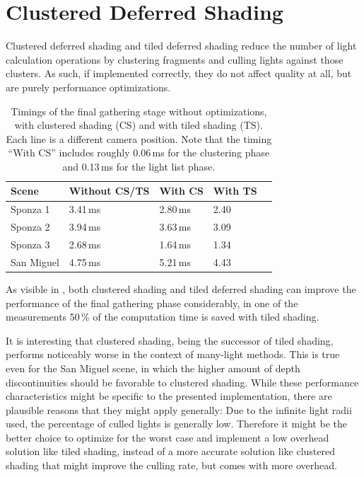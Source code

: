 



\section{Clustered Deferred Shading}
\label{sec:results:clusteredShading}

Clustered deferred shading and tiled deferred shading reduce the number of light calculation operations by clustering fragments and culling lights against those clusters. As such, if implemented correctly, they do not affect quality at all, but are purely performance optimizations.

\begin{table}[h]
    \begin{center}
        \begin{tabulary}{0.98\textwidth}{| L | L | L | L | L |}
            \hline
            Scene & Without CS/TS & With CS & With TS \\ \hline
            Sponza 1 & 3.41\,ms & 2.80\,ms & 2.40\\
            Sponza 2 & 3.94\,ms & 3.63\,ms & 3.09\\
            Sponza 3 & 2.68\,ms & 1.64\,ms & 1.34\\
            San Miguel & 4.75\,ms & 5.21\,ms & 4.43\\
            \hline
        \end{tabulary}
        \caption{Timings of the final gathering stage without optimizations, with clustered shading (CS) and with tiled shading (TS). Each line is a different camera position. Note that the timing ``With CS'' includes roughly 0.06\,ms for the clustering phase and 0.13\,ms for the light list phase.}
        \label{tab:results:timings_clustered_shading}
    \end{center}
\end{table}

As visible in , both clustered shading and tiled deferred shading can improve the performance of the final gathering phase considerably, in one of the measurements 50\,\% of the computation time is saved with tiled shading.


It is interesting that clustered shading, being the successor of tiled shading, performs noticeably worse in the context of many-light methods. This is true even for the San Miguel scene, in which the higher amount of depth discontinuities should be favorable to clustered shading. While these performance characteristics might be specific to the presented implementation, there are plausible reasons that they might apply generally: Due to the infinite light radii used, the percentage of culled lights is generally low. Therefore it might be the better choice to optimize for the worst case and implement a low overhead solution like tiled shading, instead of a more accurate solution like clustered shading that might improve the culling rate, but comes with more overhead.

